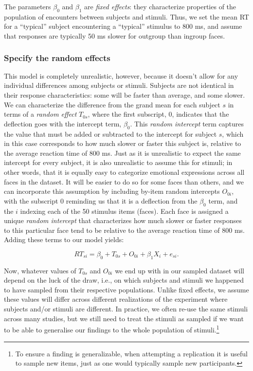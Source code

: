 \documentclass[
  english,
  doc,floatsintext]{apa6}
\begin{document}
\noindent The parameters \(\beta_0\) and \(\beta_1\) are \emph{fixed effects}: they characterize properties of the population of encounters between subjects and stimuli. Thus, we set the mean RT for a \enquote{typical} subject encountering a \enquote{typical} stimulus to 800 ms, and assume that responses are typically 50 ms slower for outgroup than ingroup faces.

\hypertarget{specify-the-random-effects}{%
\subsubsection{Specify the random effects}\label{specify-the-random-effects}}

This model is completely unrealistic, however, because it doesn't allow for any individual differences among subjects or stimuli. Subjects are not identical in their response characteristics: some will be faster than average, and some slower. We can characterize the difference from the grand mean for each subject \(s\) in terms of a \emph{random effect} \(T_{0s}\), where the first subscript, 0, indicates that the deflection goes with the intercept term, \(\beta_0\). This \emph{random intercept} term captures the value that must be added or subtracted to the intercept for subject \(s\), which in this case corresponds to how much slower or faster this subject is, relative to the average reaction time of 800 ms. Just as it is unrealistic to expect the same intercept for every subject, it is also unrealistic to assume this for stimuli; in other words, that it is equally easy to categorize emotional expressions across all faces in the dataset. It will be easier to do so for some faces than others, and we can incorporate this assumption by including by-item random intercepts \(O_{0i}\), with the subscript 0 reminding us that it is a deflection from the \(\beta_0\) term, and the \(i\) indexing each of the 50 stimulus items (faces). Each face is assigned a unique \emph{random intercept} that characterizes how much slower or faster responses to this particular face tend to be relative to the average reaction time of 800 ms. Adding these terms to our model yields:

\begin{equation}
RT_{si} = \beta_0 + T_{0s} + O_{0i} + \beta_1 X_i + e_{si} .
\end{equation}

Now, whatever values of \(T_{0s}\) and \(O_{0i}\) we end up with in our sampled dataset will depend on the luck of the draw, i.e., on which subjects and stimuli we happened to have sampled from their respective populations. Unlike fixed effects, we assume these values will differ across different realizations of the experiment where subjects and/or stimuli are different. In practice, we often re-use the same stimuli across many studies, but we still need to treat the stimuli as sampled if we want to be able to generalise our findings to the whole population of stimuli.\footnote{To ensure a finding is generalizable, when attempting a replication it is useful to sample new items, just as one would typically sample new participants.}
\end{document}
